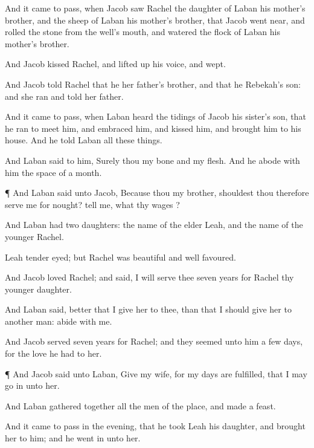 {And it came to pass, when
Jacob
saw
Rachel the
daughter of
Laban his
mother’s
brother, and the
sheep of
Laban his
mother’s
brother, that
Jacob went
near, and
rolled the
stone from the
well’s
mouth, and
watered the
flock of
Laban his
mother’s
brother.

And
Jacob
kissed
Rachel, and lifted
up his
voice, and
wept.

And
Jacob
told
Rachel that he
{} her
father’s
brother, and that he
{}
Rebekah’s
son: and she
ran and
told her
father.

And it came to pass, when
Laban
heard the
tidings of
Jacob his
sister’s
son, that he
ran to
meet him, and
embraced him, and
kissed him, and
brought him to his
house. And he
told
Laban all these
things.

And
Laban
said to him,
Surely thou
{} my
bone and my
flesh. And he
abode with him the
space of a
month.


\par }{\PP {}¶ And
Laban
said unto
Jacob, Because thou
{} my
brother, shouldest thou therefore
serve me for
nought?
tell me, what
{} thy
wages
{}?

And
Laban had
two
daughters: the
name of the
elder
{}
Leah, and the
name of the
younger
{}
Rachel.

Leah
{}
tender
eyed; but
Rachel was
beautiful and
well
favoured.

And
Jacob
loved
Rachel; and
said, I will
serve thee
seven
years for
Rachel thy
younger
daughter.

And
Laban
said,
{}
better that I
give her to thee, than that I should
give her to
another
man:
abide with me.

And
Jacob
served
seven
years for
Rachel; and they
seemed unto him
{} a
few
days, for the love he
had to her.


\par }{\PP {}¶ And
Jacob
said unto
Laban,
Give
{} my
wife, for my
days are
fulfilled, that I may go
in unto her.

And
Laban gathered
together all the
men of the
place, and
made a
feast.

And it came to pass in the
evening, that he
took
Leah his
daughter, and
brought her to him; and he went
in unto her.

}
